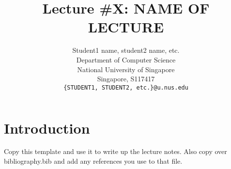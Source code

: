 \documentclass{article}
\title{Lecture \#X: NAME OF LECTURE}
\author{
  Student1 name, student2 name, etc. \\
  Department of Computer Science\\
  National University of Singapore\\
  Singapore, S117417 \\
  \texttt{\{STUDENT1, STUDENT2, etc.\}@u.nus.edu} \\
}
\begin{document}
\maketitle


\section{Introduction}
Copy this template and use it to write up the lecture notes. Also copy over
bibliography.bib and add any references you use to that file.

\small


\end{document}
